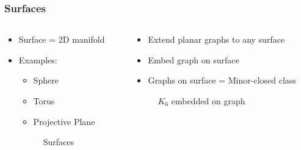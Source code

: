 \documentclass[english]{beamer}
\begin{document}
\begin{frame}
    \frametitle{Surfaces}
    \begin{columns}
    \begin{column}{0.5\textwidth}
      \begin{itemize}
        \item Surface = 2D manifold
        \item Examples: \begin{itemize}
          \item Sphere
          \item Torus
          \item Projective Plane
        \end{itemize}
        \begin{figure}
          \centering
          
          \caption{Surfaces}
        \end{figure}
      \end{itemize}

    \end{column}
    \begin{column}{0.5 \textwidth}
      \begin{itemize}
        \item Extend planar graphs to any surface
        \item Embed graph on surface
        \item Graphs on surface = Minor-closed class
      \end{itemize}
      \pause
      \begin{figure}
        \centering
        
        \caption{$K_6$ embedded on graph}
      \end{figure}
    \end{column}
    \end{columns}
\end{frame}
\end{document}
